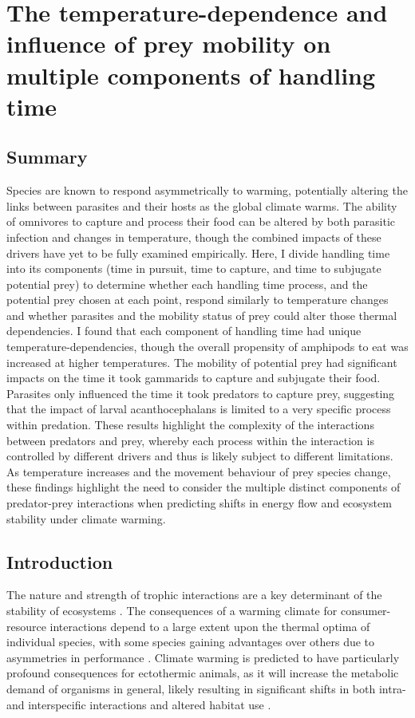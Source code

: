 \chapter[The temperature-dependence and influence of prey mobility on multiple components of handling time]{The temperature-dependence and influence of prey mobility on multiple components of handling time}
\label{chap:feeding}

\section{Summary}
Species are known to respond asymmetrically to warming, potentially altering the links between parasites and their hosts as the global climate warms. The ability of omnivores to capture and process their food can be altered by both parasitic infection and changes in temperature, though the combined impacts of these drivers have yet to be fully examined empirically. Here, I divide handling time into its components (time in pursuit, time to capture, and time to subjugate potential prey) to determine whether each handling time process, and the potential prey chosen at each point, respond similarly to temperature changes and whether parasites and the mobility status of prey could alter those thermal dependencies. I found that each component of handling time had unique temperature-dependencies, though the overall propensity of amphipods to eat was increased at higher temperatures. The mobility of potential prey had significant impacts on the time it took gammarids to capture and subjugate their food. Parasites only influenced the time it took predators to capture prey, suggesting that the impact of larval acanthocephalans is limited to a very specific process within predation. These results highlight the complexity of the interactions between predators and prey, whereby each process within the interaction is controlled by different drivers and thus is likely subject to different limitations. As temperature increases and the movement behaviour of prey species change, these findings highlight the need to consider the multiple distinct components of predator-prey interactions when predicting shifts in energy flow and ecosystem stability under climate warming.


\section{Introduction}

The nature and strength of trophic interactions are a key determinant of the stability of ecosystems \citep{may1974, pimm1984, ogorman2009, allesina2012, donohue2016, donohue2017, delong2018}. The consequences of a warming climate for consumer-resource interactions depend to a large extent upon the thermal optima of individual species, with some species gaining advantages over others due to asymmetries in performance \citep{dell2014, penk2016}. Climate warming is predicted to have particularly profound consequences for ectothermic animals, as it will increase the metabolic demand of organisms in general, likely resulting in significant shifts in both intra- and interspecific interactions and altered habitat use \citep{kordas2011, abram2017, vandervorste2017}. 

